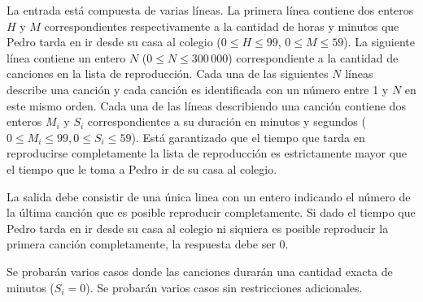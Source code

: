 \documentclass{oci}
\begin{document}
\begin{inputDescription}
  La entrada está compuesta de varias líneas.
  La primera línea contiene dos enteros $H$ y $M$ correspondientes
  respectivamente a la cantidad de horas y minutos que Pedro tarda en ir desde su
  casa al colegio ($0\leq H\leq 99$, $0\leq M\leq 59$).
  La siguiente línea contiene un entero $N$ ($0\leq N\leq 300\,000$)
  correspondiente a la cantidad de canciones en la lista de reproducción.
  Cada una de las siguientes $N$ líneas describe una canción y cada canción es
  identificada con un número entre 1 y $N$ en este mismo orden.
  Cada una de las líneas describiendo una canción contiene dos enteros $M_i$ y $S_i$
  correspondientes a su duración en minutos y segundos ($0\leq
  M_i\leq 99, 0\leq S_i\leq 59$).
  Está garantizado que el tiempo que tarda en reproducirse completamente la
  lista de reproducción es estrictamente mayor que el tiempo que le toma a Pedro
  ir de su casa al colegio.
\end{inputDescription}

\begin{outputDescription}
  La salida debe consistir de una única linea con un entero indicando el número 
  de la última canción que es posible reproducir completamente.
  Si dado el tiempo que Pedro tarda en ir desde su casa al colegio ni siquiera
  es posible reproducir la primera canción completamente, la respuesta
  debe ser 0.
\end{outputDescription}

\begin{scoreDescription}
   Se probarán varios casos donde las canciones durarán una cantidad
  exacta de minutos ($S_i = 0$).
   Se probarán varios casos sin restricciones adicionales. 
\end{scoreDescription}

\begin{sampleDescription}
\end{sampleDescription}
\end{document}
